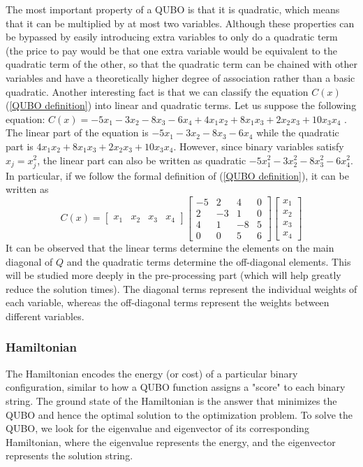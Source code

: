 \documentclass[11pt]{article}
\begin{document}
The most important property of a QUBO is that it is quadratic, which means that it can be multiplied by at most two variables. Although these properties can be bypassed by easily introducing extra variables to only do a quadratic term (the price to pay would be that one extra variable would be equivalent to the quadratic term of the other, so that the quadratic term can be chained with other variables and have a theoretically higher degree of association rather than a basic quadratic.
Another interesting fact is that we can classify the equation \( C(x)\) (\ref{QUBO definition}) into linear and quadratic terms. Let us suppose the following equation:  \(C(x)=-5x_1-3x_2-8x_3-6x_4+4x_1x_2+8x_1x_3+2x_2x_3+10x_3x_4\)
. The linear part of the equation is \(-5x_1-3x_2-8x_3-6x_4\) while the quadratic part is \(4x_1x_2+8x_1x_3+2x_2x_3+10x_3x_4\). However, since binary variables satisfy \(x_j=x^2_j\), the linear part can also be written as quadratic \(-5x_1^2-3x_2^2-8x_3^2-6x_4^2\). In particular, if we follow the formal definition of  (\ref{QUBO definition}), it can be written as \[
C(x)=\begin{bmatrix}x_1 & x_2 & x_3 & x_4 \end{bmatrix} \begin{bmatrix} -5 & 2 & 4 & 0 \\ 2 & -3 & 1 & 0 \\ 4 & 1 & -8 & 5 \\ 0 & 0 & 5 & 6 \end{bmatrix} \begin{bmatrix} x_1 \\ x_2 \\ x_3 \\ x_4 \end{bmatrix}
\]
It can be observed that the linear terms determine the elements on the main diagonal of \(Q\) and the quadratic terms determine the off-diagonal elements. This will be studied more deeply in the pre-processing part (which will help greatly reduce the solution times). The diagonal terms represent the individual weights of each variable, whereas the off-diagonal terms represent the weights between different variables.

\subsubsection{Hamiltonian}

The Hamiltonian encodes the energy (or cost) of a particular binary configuration, similar to how a QUBO function assigns a "score" to each binary string. The ground state of the Hamiltonian is the answer that minimizes the QUBO and hence the optimal solution to the optimization problem. To solve the QUBO, we look for the eigenvalue and eigenvector of its corresponding Hamiltonian, where the eigenvalue represents the energy, and the eigenvector represents the solution string.
\end{document}
